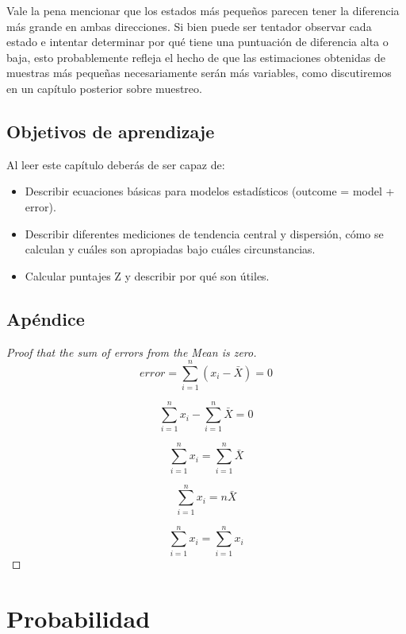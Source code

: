 \documentclass[
  12pt,
]{book}
\providecommand{\tightlist}{%
  \setlength{\itemsep}{0pt}\setlength{\parskip}{0pt}}
\theoremstyle{definition}
\theoremstyle{definition}
\theoremstyle{definition}
\theoremstyle{remark}
\begin{document}
Vale la pena mencionar que los estados más pequeños parecen tener la diferencia más grande en ambas direcciones. Si bien puede ser tentador observar cada estado e intentar determinar por qué tiene una puntuación de diferencia alta o baja, esto probablemente refleja el hecho de que las estimaciones obtenidas de muestras más pequeñas necesariamente serán más variables, como discutiremos en un capítulo posterior sobre muestreo.

\hypertarget{objetivos-de-aprendizaje}{%
\section{Objetivos de aprendizaje}\label{objetivos-de-aprendizaje}}

Al leer este capítulo deberás de ser capaz de:

\begin{itemize}
\tightlist
\item
  Describir ecuaciones básicas para modelos estadísticos (outcome = model + error).
\item
  Describir diferentes mediciones de tendencia central y dispersión, cómo se calculan y cuáles son apropiadas bajo cuáles circunstancias.
\item
  Calcular puntajes Z y describir por qué son útiles.
\end{itemize}

\hypertarget{apuxe9ndice}{%
\section{Apéndice}\label{apuxe9ndice}}

\begin{proof}[Proof that the sum of errors from the Mean is zero]
{}
\[
error = \sum_{i=1}^{n}(x_i - \bar{X}) = 0
\]

\[
\sum_{i=1}^{n}x_i - \sum_{i=1}^{n}\bar{X}=0
\]

\[
\sum_{i=1}^{n}x_i = \sum_{i=1}^{n}\bar{X}
\]

\[
\sum_{i=1}^{n}x_i = n\bar{X}
\]

\[
\sum_{i=1}^{n}x_i = \sum_{i=1}^{n}x_i
\]
\end{proof}

\hypertarget{probabilidad}{%
\chapter{Probabilidad}\label{probabilidad}}
\end{document}
